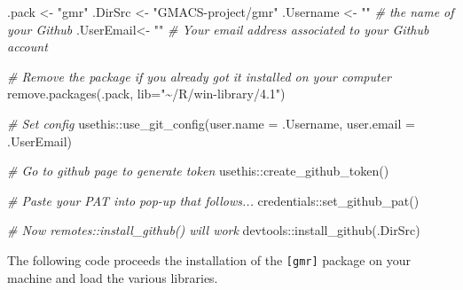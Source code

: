 \documentclass[
]{article}
\newenvironment{Shaded}{\begin{snugshade}}{\end{snugshade}}
\newcommand{\AttributeTok}[1]{\textcolor[rgb]{0.77,0.63,0.00}{#1}}
\newcommand{\CommentTok}[1]{\textcolor[rgb]{0.56,0.35,0.01}{\textit{#1}}}
\newcommand{\FunctionTok}[1]{\textcolor[rgb]{0.00,0.00,0.00}{#1}}
\newcommand{\NormalTok}[1]{#1}
\newcommand{\OtherTok}[1]{\textcolor[rgb]{0.56,0.35,0.01}{#1}}
\newcommand{\SpecialCharTok}[1]{\textcolor[rgb]{0.00,0.00,0.00}{#1}}
\newcommand{\StringTok}[1]{\textcolor[rgb]{0.31,0.60,0.02}{#1}}
\begin{document}
\begin{Shaded}
\begin{Highlighting}[]

\NormalTok{.pack }\OtherTok{\textless{}{-}} \StringTok{"gmr"}
\NormalTok{.DirSrc }\OtherTok{\textless{}{-}} \StringTok{"GMACS{-}project/gmr"}
\NormalTok{.Username }\OtherTok{\textless{}{-}} \StringTok{""}                     \CommentTok{\# the name of your Github}
\NormalTok{.UserEmail}\OtherTok{\textless{}{-}} \StringTok{""}        \CommentTok{\# Your email address associated to your Github account}

\CommentTok{\# Remove the package if you already got it installed on your computer}
\FunctionTok{remove.packages}\NormalTok{(.pack, }\AttributeTok{lib=}\StringTok{"\textasciitilde{}/R/win{-}library/4.1"}\NormalTok{)}

\CommentTok{\# Set config}
\NormalTok{usethis}\SpecialCharTok{::}\FunctionTok{use\_git\_config}\NormalTok{(}\AttributeTok{user.name =}\NormalTok{ .Username, }\AttributeTok{user.email =}\NormalTok{ .UserEmail)}

\CommentTok{\# Go to github page to generate token}
\NormalTok{usethis}\SpecialCharTok{::}\FunctionTok{create\_github\_token}\NormalTok{() }

\CommentTok{\# Paste your PAT into pop{-}up that follows...}
\NormalTok{credentials}\SpecialCharTok{::}\FunctionTok{set\_github\_pat}\NormalTok{()}

\CommentTok{\# Now remotes::install\_github() will work}
\NormalTok{devtools}\SpecialCharTok{::}\FunctionTok{install\_github}\NormalTok{(.DirSrc)}
\end{Highlighting}
\end{Shaded}

The following code proceeds the installation of the \texttt{{[}gmr{]}}
package on your machine and load the various libraries.
\end{document}
